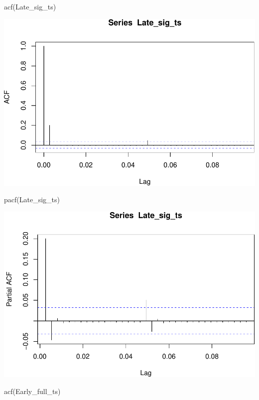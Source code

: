 \documentclass[
  12pt,
]{article}
\newenvironment{Shaded}{\begin{snugshade}}{\end{snugshade}}
\newcommand{\FunctionTok}[1]{\textcolor[rgb]{0.00,0.00,0.00}{#1}}
\newcommand{\NormalTok}[1]{#1}
\begin{document}
\begin{Shaded}
\begin{Highlighting}[]
\FunctionTok{acf}\NormalTok{(Late\_sig\_ts)}
\end{Highlighting}
\end{Shaded}

\includegraphics{Project_Template_TLK_files/figure-latex/unnamed-chunk-1-3.pdf}

\begin{Shaded}
\begin{Highlighting}[]
\FunctionTok{pacf}\NormalTok{(Late\_sig\_ts)}
\end{Highlighting}
\end{Shaded}

\includegraphics{Project_Template_TLK_files/figure-latex/unnamed-chunk-1-4.pdf}

\begin{Shaded}
\begin{Highlighting}[]
\FunctionTok{acf}\NormalTok{(Early\_full\_ts)}
\end{Highlighting}
\end{Shaded}
\end{document}
